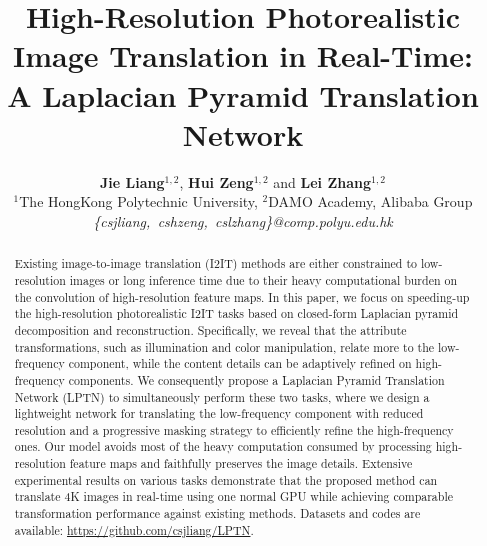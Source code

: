 \documentclass[10pt,twocolumn,letterpaper]{article}
\begin{document}
\title{High-Resolution Photorealistic Image Translation in Real-Time:\\ A Laplacian Pyramid Translation Network}

\author{\textbf{Jie Liang}$^{1, 2}$\footnotemark[1],\;  \textbf{Hui Zeng}$^{1, 2}$\footnotemark[1]\; and \textbf{Lei Zhang}$^{1,2}$\footnotemark[2]\\
$^1$The HongKong Polytechnic University,\;  $^2$DAMO Academy, Alibaba Group\\
\textit{\{csjliang,\, cshzeng,\, cslzhang\}@comp.polyu.edu.hk}\\
}

\maketitle

\renewcommand{\thefootnote}{\fnsymbol{footnote}}

\begin{abstract}
Existing image-to-image translation (I2IT) methods are either constrained to low-resolution images or long inference time due to their heavy computational burden on the convolution of high-resolution feature maps. In this paper, we focus on speeding-up the high-resolution photorealistic I2IT tasks based on closed-form Laplacian pyramid decomposition and reconstruction. Specifically, we reveal that the attribute transformations, such as illumination and color manipulation, relate more to the low-frequency component, while the content details can be adaptively refined on high-frequency components. We consequently propose a Laplacian Pyramid Translation Network (LPTN) to simultaneously perform these two tasks, where we design a lightweight network for translating the low-frequency component with reduced resolution and a progressive masking strategy to efficiently refine the high-frequency ones. Our model avoids most of the heavy computation consumed by processing high-resolution feature maps and faithfully preserves the image details. Extensive experimental results on various tasks demonstrate that the proposed method can translate 4K images in real-time using one normal GPU while achieving comparable transformation performance against existing methods. Datasets and codes are available: \href{https://github.com/csjliang/LPTN}{https://github.com/csjliang/LPTN}.
\end{abstract}
\end{document}
